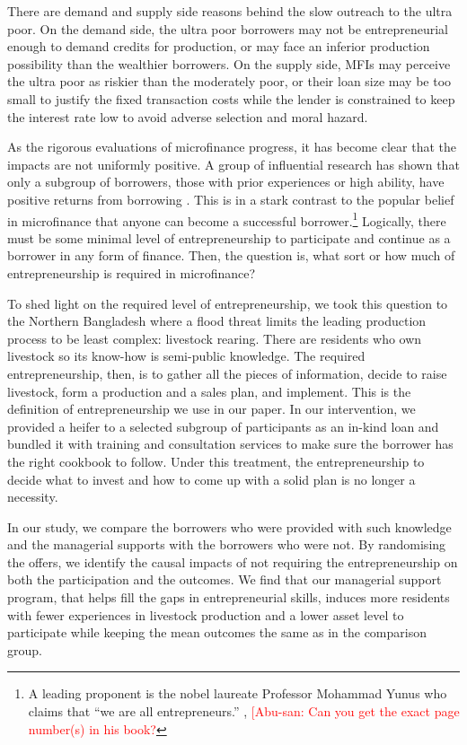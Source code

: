 	There are demand and supply side reasons behind the slow outreach to the ultra poor. On the demand side, the ultra poor borrowers may not be entrepreneurial enough to demand credits for production, or may face an inferior production possibility than the wealthier borrowers. On the supply side, MFIs may perceive the ultra poor as riskier than the moderately poor, or their loan size may be too small to justify the fixed transaction costs while the lender is constrained to keep the interest rate low to avoid adverse selection and moral hazard. 

	As the rigorous evaluations of microfinance progress, it has become clear that the impacts are not uniformly positive. A group of influential research has shown that only a subgroup of borrowers, those with prior experiences or high ability, have positive returns from borrowing \citep{Banerjee2015Miracle, Mckenzie2017Spurring, Buera2017, Banerjee2019MFPovertyTrap}. This is in a stark contrast to the popular belief in microfinance that anyone can become a successful borrower.\footnote{A leading proponent is the nobel laureate Professor Mohammad Yunus who claims that ``we are all entrepreneurs.'' \citep{Yunus2003}, \citep{Cosic2017} \textcolor{red}{[Abu-san: Can you get the exact page number(s) in his book?} } Logically, there must be some minimal level of entrepreneurship to participate and continue as a borrower in any form of finance. Then, the question is, what sort or how much of entrepreneurship is required in microfinance? 
	
	To shed light on the required level of entrepreneurship, we took this question to the Northern Bangladesh where a flood threat limits the leading production process to be least complex: livestock rearing. There are residents who own livestock so its know-how is semi-public knowledge. The required entrepreneurship, then, is to gather all the pieces of information, decide to raise livestock, form a production and a sales plan, and implement. This is the definition of entrepreneurship we use in our paper. In our intervention, we provided a heifer to a selected subgroup of participants as an in-kind loan and bundled it with training and consultation services to make sure the borrower has the right cookbook to follow. Under this treatment, the entrepreneurship to decide what to invest and how to come up with a solid plan is no longer a necessity.

	In our study, we compare the borrowers who were provided with such knowledge and the managerial supports with the borrowers who were not. By randomising the offers, we identify the causal impacts of not requiring the entrepreneurship on both the participation and the outcomes. We find that our managerial support program, that helps fill the gaps in entrepreneurial skills, induces more residents with fewer experiences in livestock production and a lower asset level to participate while keeping the mean outcomes the same as in the comparison group.%

